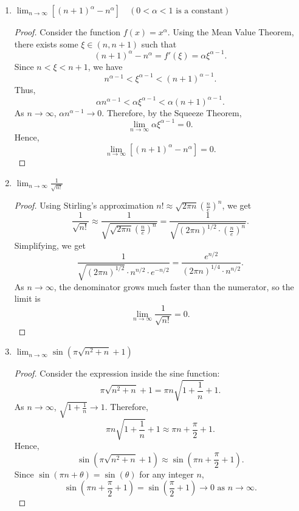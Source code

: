 \begin{solution}
\begin{enumerate}
    \item $\lim_{n \to \infty}\left[(n+1)^{\alpha}-n^{\alpha}\right] \quad(0<\alpha<1 \text{ is a constant})$
    \begin{proof}
    Consider the function $f(x) = x^{\alpha}$. Using the Mean Value Theorem, there exists some $\xi \in (n, n+1)$ such that
    \[
    (n+1)^{\alpha} - n^{\alpha} = f'( \xi ) = \alpha \xi^{\alpha-1}.
    \]
    Since $n < \xi < n+1$, we have
    \[
    n^{\alpha-1} < \xi^{\alpha-1} < (n+1)^{\alpha-1}.
    \]
    Thus,
    \[
    \alpha n^{\alpha-1} < \alpha \xi^{\alpha-1} < \alpha (n+1)^{\alpha-1}.
    \]
    As $n \to \infty$, $\alpha n^{\alpha-1} \to 0$. Therefore, by the Squeeze Theorem,
    \[
    \lim_{n \to \infty} \alpha \xi^{\alpha-1} = 0.
    \]
    Hence,
    \[
    \lim_{n \to \infty} \left[(n+1)^{\alpha} - n^{\alpha}\right] = 0.
    \]
    \end{proof}

    \item $\lim_{n \to \infty} \frac{1}{\sqrt{n!}}$
    \begin{proof}
    Using Stirling's approximation $n! \approx \sqrt{2\pi n} \left(\frac{n}{e}\right)^n$, we get
    \[
    \frac{1}{\sqrt{n!}} \approx \frac{1}{\sqrt{\sqrt{2\pi n} \left(\frac{n}{e}\right)^n}} = \frac{1}{\sqrt{(2\pi n)^{1/2} \cdot \left(\frac{n}{e}\right)^n}}.
    \]
    Simplifying, we get
    \[
    \frac{1}{\sqrt{(2\pi n)^{1/2}} \cdot n^{n/2} \cdot e^{-n/2}} = \frac{e^{n/2}}{(2\pi n)^{1/4} \cdot n^{n/2}}.
    \]
    As $n \to \infty$, the denominator grows much faster than the numerator, so the limit is
    \[
    \lim_{n \to \infty} \frac{1}{\sqrt{n!}} = 0.
    \]
    \end{proof}

    \item $\lim_{n \to \infty} \sin(\pi \sqrt{n^2 + n} + 1)$
    \begin{proof}
    Consider the expression inside the sine function:
    \[
    \pi \sqrt{n^2 + n} + 1 = \pi n \sqrt{1 + \frac{1}{n}} + 1.
    \]
    As $n \to \infty$, $\sqrt{1 + \frac{1}{n}} \to 1$. Therefore,
    \[
    \pi n \sqrt{1 + \frac{1}{n}} + 1 \approx \pi n + \frac{\pi}{2} + 1.
    \]
    Hence,
    \[
    \sin(\pi \sqrt{n^2 + n} + 1) \approx \sin\left(\pi n + \frac{\pi}{2} + 1\right).
    \]
    Since $\sin(\pi n + \theta) = \sin(\theta)$ for any integer $n$,
    \[
    \sin\left(\pi n + \frac{\pi}{2} + 1\right) = \sin\left(\frac{\pi}{2} + 1\right) \to 0 \text{ as } n \to \infty.
    \]
    \end{proof}
\end{enumerate}
\end{solution}

